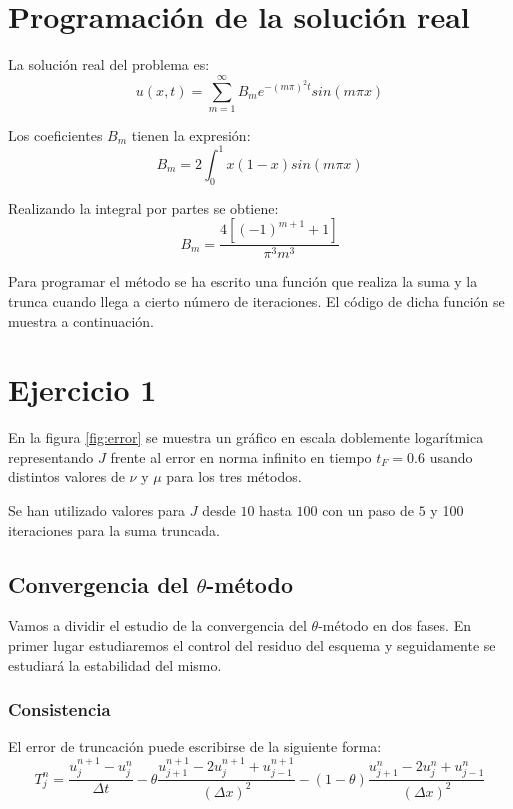 \documentclass[spanish]{mathnotes}
\begin{document}
	\section{Programación de la solución real}
	La solución real del problema es:
	$$u(x,t) = \sum_{m=1}^\infty B_m e^{-(m\pi)^2 t} sin(m\pi x)$$ 
	
	Los coeficientes $B_m$ tienen la expresión: $$B_m = 2\int_0^1 x(1-x) sin(m\pi x)$$
	
	Realizando la integral por partes se obtiene:
	$$B_m = \frac{4\left[ (-1)^{m+1}+1\right]}{\pi^3m^3}$$
	
	Para programar el método se ha escrito una función que realiza la suma y la trunca cuando llega a cierto número de iteraciones. El código de dicha función se muestra a continuación.
	
	\lstset{style=matlabStyle}
	
	
	\newpage
	\section{Ejercicio 1}
	En la figura \ref{fig:error} se muestra un gráfico en escala doblemente logarítmica representando $J$ frente al error en norma infinito en tiempo $t_F = 0.6$ usando distintos valores de $\nu$ y $\mu$ para los tres métodos. 
	
	Se han utilizado valores para $J$ desde $10$ hasta $100$ con un paso de $5$ y 100 iteraciones para la suma truncada.
	
	
	\subsection{Convergencia del $\theta$-método}
	Vamos a dividir el estudio de la convergencia del $\theta$-método en dos fases. En primer lugar estudiaremos el control del residuo del esquema y seguidamente se estudiará la estabilidad del mismo.
	
	\subsubsection{Consistencia}
	El error de truncación puede escribirse de la siguiente forma:
	$$T_j^n = \frac{u_j^{n+1}-u_j^n}{\Delta t} 
	- \theta\frac{u_{j+1}^{n+1}-2u_{j}^{n+1}+u_{j-1}^{n+1}}{(\Delta x)^2} 
	- (1-\theta)\frac{u_{j+1}^{n}-2u_{j}^{n}+u_{j-1}^{n}}{(\Delta x)^2}$$
	
\end{document}
